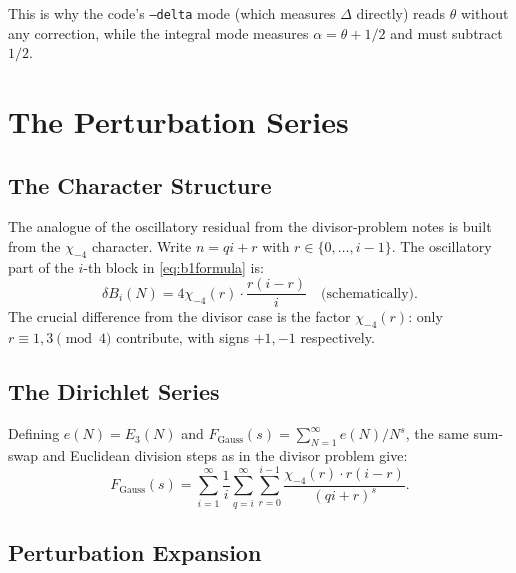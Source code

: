 \documentclass[12pt]{article}
\theoremstyle{definition}
\begin{document}
This is why the code's \texttt{--delta} mode (which measures $\Delta$
directly) reads $\theta$ without any correction, while the integral
mode measures $\alpha = \theta + 1/2$ and must subtract $1/2$.

\section{The Perturbation Series}

\subsection{The Character Structure}

The analogue of the oscillatory residual from the divisor-problem notes is
built from the $\chi_{-4}$ character.  Write $n = qi + r$ with
$r \in \{0,\ldots,i-1\}$.  The oscillatory part of the $i$-th block in
\eqref{eq:b1formula} is:
\begin{equation}
    \delta B_i(N) = 4\chi_{-4}(r)\cdot\frac{r(i-r)}{i}
    \quad \text{(schematically)}.
    \label{eq:dB}
\end{equation}
The crucial difference from the divisor case is the factor $\chi_{-4}(r)$:
only $r \equiv 1,3\pmod{4}$ contribute, with signs $+1,-1$ respectively.

\subsection{The Dirichlet Series}

Defining $e(N) = E_3(N)$ and
$F_{\text{Gauss}}(s) = \sum_{N=1}^\infty e(N)/N^s$,
the same sum-swap and Euclidean division steps as in the divisor problem give:
\begin{equation}
    F_{\text{Gauss}}(s) = \sum_{i=1}^\infty \frac{1}{i}
    \sum_{q=i}^\infty \sum_{r=0}^{i-1}
    \frac{\chi_{-4}(r)\cdot r(i-r)}{(qi+r)^s}.
    \label{eq:FGswap}
\end{equation}

\subsection{Perturbation Expansion}
\end{document}
